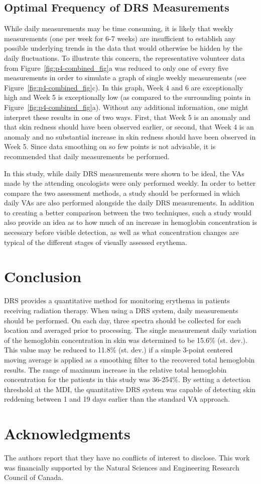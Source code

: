 \subsection{Optimal Frequency of DRS Measurements}
While daily measurements may be time consuming, it is likely that weekly measurements (one per week for 6-7 weeks) are insufficient to establish any possible underlying trends in the data that would otherwise be hidden by the daily fluctuations. To illustrate this concern, the representative volunteer data from Figure~\ref{fig:p4-combined_fig}a was reduced to only one of every five measurements in order to simulate a graph of single weekly measurements (see Figure~\ref{fig:p4-combined_fig}c). In this graph, Week 4 and 6 are exceptionally high and Week 5 is exceptionally low (as compared to the surrounding points in Figure~\ref{fig:p4-combined_fig}a). Without any additional information, one might interpret these results in one of two ways. First, that Week 5 is an anomaly and that skin redness should have been observed earlier, or second, that Week 4 is an anomaly and no substantial increase in skin redness should have been observed in Week 5. Since data smoothing on so few points is not advisable, it is recommended that daily measurements be performed.

In this study, while daily DRS measurements were shown to be ideal, the VAs made by the attending oncologists were only performed weekly. In order to better compare the two assessment methods, a study should be performed in which daily VAs are also performed alongside the daily DRS measurements. In addition to creating a better comparison between the two techniques, such a study would also provide an idea as to how much of an increase in hemoglobin concentration is necessary before visible detection, as well as what concentration changes are typical of the different stages of visually assessed erythema.

\section{Conclusion}
DRS provides a quantitative method for monitoring erythema in patients receiving radiation therapy. When using a DRS system, daily measurements should be performed. On each day, three spectra should be collected for each location and averaged prior to processing. The single measurement daily variation of the hemoglobin concentration in skin was determined to be 15.6\% (st. dev.). This value may be reduced to 11.8\% (st. dev.) if a simple 3-point centered moving average is applied as a smoothing filter to the recovered total hemoglobin results. The range of maximum increase in the relative total hemoglobin concentration for the patients in this study was 36-254\%. By setting a detection threshold at the MDI, the quantitative DRS system was capable of detecting skin reddening between 1 and 19 days earlier than the standard VA approach.

\section*{Acknowledgments}
The authors report that they have no conflicts of interest to disclose. This work was financially supported by the Natural Sciences and Engineering Research Council of Canada.